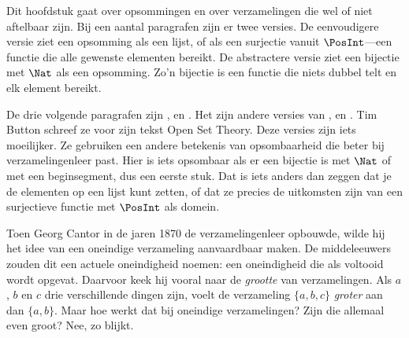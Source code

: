 \documentclass[openany]{memoir}
\begin{document}

\begin{editorial}
Dit hoofdstuk gaat over opsommingen en over verzamelingen die wel of
niet aftelbaar zijn. Bij een aantal paragrafen zijn er twee versies. De
eenvoudigere versie ziet een opsomming als een lijst, of als een
surjectie vanuit $\PosInt$---een functie die alle gewenste elementen
bereikt. De abstractere versie ziet een bijectie met $\Nat$ als een
opsomming. Zo'n bijectie is een functie die niets dubbel telt en elk
element bereikt.
\end{editorial}











\begin{editorial}
De drie volgende paragrafen zijn ,
 en . Het
zijn andere versies van ,
 en . Tim Button
schreef ze voor zijn tekst Open Set Theory. Deze versies zijn iets
moeilijker. Ze gebruiken een andere betekenis van opsombaarheid die
beter bij verzamelingenleer past. Hier is iets opsombaar als er een
bijectie is met $\Nat$ of met een beginsegment, dus een eerste stuk.
Dat is iets anders dan zeggen dat je de elementen op een lijst kunt
zetten, of dat ze precies de uitkomsten zijn van een surjectieve functie
met $\PosInt$ als domein.
\end{editorial}
\endgroup

\begingroup
\def\olfilename{OLP-0028}
\def\olfilepath{content/sets-functions-relations/size-of-sets/}
\hypertarget{unit-OLP-0028}{}





Toen Georg Cantor in de jaren 1870 de verzamelingenleer opbouwde, wilde hij het
idee van een oneindige verzameling aanvaardbaar maken. De
middeleeuwers zouden dit een actuele oneindigheid noemen: een oneindigheid die
als voltooid wordt opgevat. Daarvoor keek hij vooral naar de \emph{grootte} van
verzamelingen. Als $a$, $b$ en $c$
drie verschillende dingen zijn, voelt de verzameling $\{a, b, c\}$
\emph{groter} aan dan $\{a, b\}$. Maar hoe werkt dat bij oneindige
verzamelingen? Zijn die allemaal even groot? Nee, zo blijkt.
\end{document}
